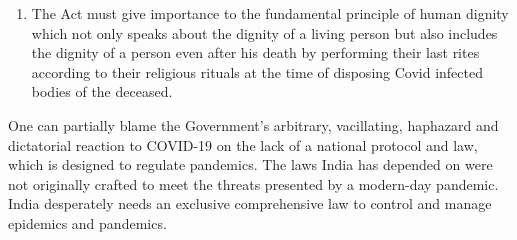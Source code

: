 \begin{multicols}{2}
\begin{enumerate}[label=$\bullet$]
\item The Act must give importance to the fundamental principle of human dignity which
not only speaks about the dignity of a living person but also includes the dignity of a
person even after his death by performing their last rites according to their religious
rituals at the time of disposing Covid infected bodies of the deceased.
\end{enumerate}

\noi
One can partially blame the Government’s arbitrary, vacillating, haphazard and dictatorial
reaction to COVID-19 on the lack of a national protocol and law, which is designed to
regulate pandemics. The laws India has depended on were not originally crafted to meet the
threats presented by a modern-day pandemic. India desperately needs an exclusive
comprehensive law to control and manage epidemics and pandemics.

\end{multicols}
